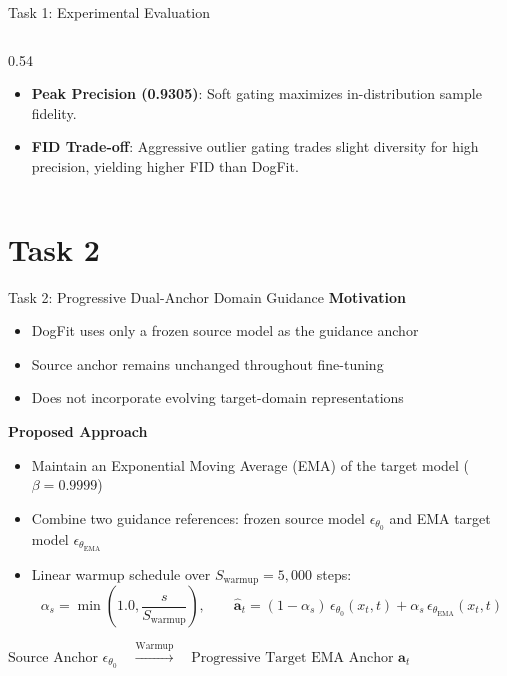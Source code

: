 \documentclass[aspectratio=169]{beamer}
\begin{document}
\begin{frame}{Task 1: Experimental Evaluation}
\begin{columns}[T]
\begin{column}{0.54\textwidth}
            \vspace{-0.15cm}
            \begin{itemize}
                \setlength{\itemsep}{0.2em}
                \item \textbf{Peak Precision (0.9305)}: Soft gating maximizes in-distribution sample fidelity.
                \item \textbf{FID Trade-off}: Aggressive outlier gating trades slight diversity for high precision, yielding higher FID than DogFit.
            \end{itemize}
        \end{column}
    \end{columns}
\end{frame}

\section{Task 2}

\begin{frame}{Task 2: Progressive Dual-Anchor Domain Guidance}
    \textbf{Motivation}
    \begin{itemize}
        \item DogFit uses only a frozen source model as the guidance anchor
        \item Source anchor remains unchanged throughout fine-tuning
        \item Does not incorporate evolving target-domain representations
    \end{itemize}

    \vspace{0.2cm}
    \textbf{Proposed Approach}
    \begin{itemize}
        \item Maintain an Exponential Moving Average (EMA) of the target model ($\beta = 0.9999$)
        \item Combine two guidance references: frozen source model $\epsilon_{\theta_0}$ and EMA target model $\epsilon_{\theta_{\text{EMA}}}$
        \item Linear warmup schedule over $S_{\text{warmup}} = 5,000$ steps:
        \[
        \alpha_s = \min\left(1.0, \frac{s}{S_{\text{warmup}}}\right), \qquad \mathbf{\hat{a}}_t = (1 - \alpha_s)\,\epsilon_{\theta_0}(x_t, t) + \alpha_s\,\epsilon_{\theta_{\text{EMA}}}(x_t, t)
        \]
    \end{itemize}

    \vspace{-0.1cm}
    \begin{center}
        $\text{Source Anchor } \epsilon_{\theta_0} \quad \xrightarrow{\text{Warmup}} \quad \text{Progressive Target EMA Anchor } \mathbf{\hat{a}}_t$
    \end{center}
\end{frame}
\end{document}
